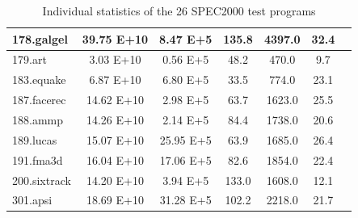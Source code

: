 \begin{table}[h]
\begin{tabular}{|l|c|c|c|c|c|c|}
178.galgel       & 39.75 E+10    & 8.47 E+5      & 135.8         & 4397.0        & 32.4 \\ \hline
179.art          & 3.03 E+10     & 0.56 E+5      & 48.2          & 470.0         & 9.7 \\ \hline
183.equake       & 6.87 E+10     & 6.80 E+5      & 33.5          & 774.0         & 23.1 \\ \hline
187.facerec      & 14.62 E+10    & 2.98 E+5      & 63.7          & 1623.0        & 25.5 \\ \hline
188.ammp         & 14.26 E+10    & 2.14 E+5      & 84.4          & 1738.0        & 20.6 \\ \hline
189.lucas        & 15.07 E+10    & 25.95 E+5     & 63.9          & 1685.0        & 26.4 \\ \hline
191.fma3d        & 16.04 E+10    & 17.06 E+5     & 82.6          & 1854.0        & 22.4 \\ \hline
200.sixtrack     & 14.20 E+10    & 3.94 E+5      & 133.0         & 1608.0        & 12.1 \\ \hline
301.apsi         & 18.69 E+10    & 31.28 E+5     & 102.2         & 2218.0        & 21.7 \\ \hline
\end{tabular}
\caption{Individual statistics of the 26 SPEC2000 test programs}
\label{tbl:all-times-spec2k}
\end{table}

